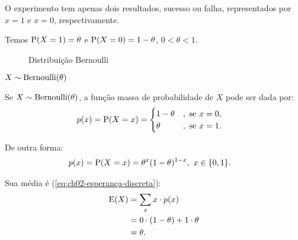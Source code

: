 O experimento tem apenas dois resultados, sucesso ou falha,
representados por $x=1$ e $x=0$, respectivamente.

Temos $\operatorname{P}(X = 1) = \theta$ e $\operatorname{P}(X = 0) = 1 - \theta$, $0 < \theta < 1$.

\begin{figure}[ht!]
    \centering
    \caption{Distribuição Bernoulli}
    \label{fig:ch06-bernoulli}
\end{figure}

\begin{notation}
    $X \sim \operatorname{Bernoulli}(\theta)$
\end{notation}

Se $X \sim \operatorname{Bernoulli}(\theta)$, a função massa de probabilidade de $X$ pode ser dada por:
\begin{align*}
    p(x) = \operatorname{P}(X = x) &= \begin{cases}
        1 - \theta&,\ \text{se } x = 0, \\
        \theta    &,\ \text{se } x = 1.
    \end{cases}
\end{align*}

De outra forma:
\begin{align}
    p(x) = \operatorname{P}(X = x) &= \theta^x(1 - \theta)^{1-x},\ x \in \{0, 1\}.
\end{align}

Sua média é (\cref{eq:ch02-esperança-discreta}):
\begin{align*}
    \operatorname{E}(X) &= \sum_x x\cdot p(x) \\
    & = 0 \cdot(1-\theta) + 1\cdot\theta \\
    &= \theta.
\end{align*}

